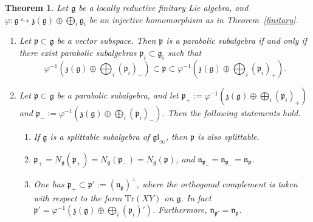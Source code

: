 \documentclass{article}
\newcommand {\tr} {\mathrm{Tr}}
\def\gl{\mathfrak {gl}}
\def\g{\mathfrak {g}}
\def\n{\mathfrak {n}}
\def\p{\mathfrak {p}}
\def\z{\mathfrak {z}}
\newtheorem{thm}{Theorem}[section]
\begin{document}
\begin{thm} \label{generalthm}
Let $\g$ be a locally reductive finitary Lie algebra, and $\varphi \colon \g \hookrightarrow \z(\g) \oplus \bigoplus_i \g_i$ be an injective homomorphism as in Theorem~\ref{finitary}.

\begin{enumerate}
\item
Let $\p \subset \g$ be a vector subspace.  Then $\p$ is a parabolic subalgebra if and only if there exist
parabolic subalgebras $\p_i \subset \g_i$ such that
$$\varphi^{-1} \left( \z(\g) \oplus \bigoplus_i (\p_i)_- \right) \subset \p \subset \varphi^{-1} \left( \z(\g) \oplus \bigoplus_i (\p_i)_+ \right).$$

\item
Let $\p \subset \g$ be a parabolic subalgebra, and let $\p_+ := \varphi^{-1} \left( \z(\g) \oplus \bigoplus_i (\p_i)_+ \right)$  and $\p_- := \varphi^{-1} \left( \z(\g) \oplus \bigoplus_i (\p_i)_- \right) $.
Then the following statements hold.
\begin{enumerate}
\item \label{firstclaim} If $\g$ is a splittable subalgebra of $\gl_\infty$, then $\p$ is also splittable.
\item \label{secondclaim} $\p_+ = N_\g(\p_+) = N_\g(\p_-) = N_\g(\p)$, and $\n_{\p_+} = \n_{\p_-} = \n_\p$.
\item \label{thirdclaim} One has $\p_+ \subset \p' := (\n_\p)^\perp$, where the orthogonal complement is taken with respect to the form $\tr(XY)$ on $\g$.  In fact $\p' = \varphi^{-1} \left( \z(\g) \oplus \bigoplus_i (\p_i)' \right)$. 
Furthermore, $\n_{\p'} = \n_\p$. 
\end{enumerate}
\end{enumerate}
\end{thm}
\end{document}
